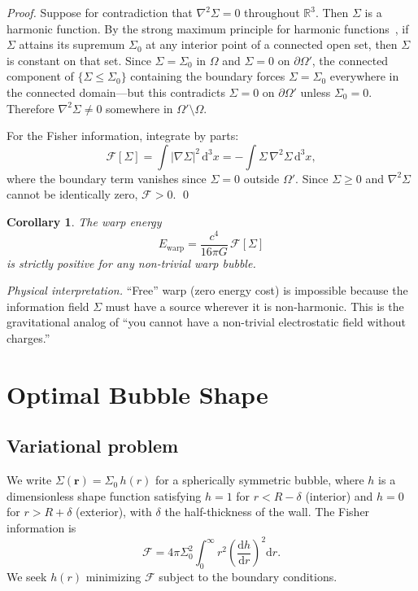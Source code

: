 \documentclass[prd,twocolumn,superscriptaddress,longbibliography]{revtex4-2}
\newcommand{\Ewarp}{E_{\mathrm{warp}}}
\newcommand{\Fisher}{\mathcal{F}}
\newcommand{\dd}{\mathrm{d}}
\newtheorem{corollary}{Corollary}
\begin{document}
\noindent\emph{Proof.}\;
Suppose for contradiction that $\nabla^2\Sigma = 0$ throughout
$\mathbb{R}^3$.  Then $\Sigma$ is a harmonic function.  By the
strong maximum principle for harmonic functions~\cite{EvansBook},
if $\Sigma$ attains its supremum $\Sigma_0$ at any interior point
of a connected open set, then $\Sigma$ is constant on that set.
Since $\Sigma = \Sigma_0$ in $\Omega$ and $\Sigma = 0$ on
$\partial\Omega'$, the connected component of
$\{\Sigma \leq \Sigma_0\}$ containing the boundary forces
$\Sigma = \Sigma_0$ everywhere in the connected domain---but
this contradicts $\Sigma = 0$ on $\partial\Omega'$ unless
$\Sigma_0 = 0$.  Therefore $\nabla^2\Sigma \neq 0$ somewhere
in $\Omega' \setminus \Omega$.

For the Fisher information, integrate by parts:
\begin{equation}
\Fisher[\Sigma] = \int |\nabla\Sigma|^2\,\dd^3x
= -\int \Sigma\,\nabla^2\Sigma\,\dd^3x,
\end{equation}
where the boundary term vanishes since $\Sigma = 0$ outside
$\Omega'$.  Since $\Sigma \geq 0$ and $\nabla^2\Sigma$ cannot be
identically zero, $\Fisher > 0$.  \qed

\begin{corollary}
The warp energy
\begin{equation}
\Ewarp = \frac{c^4}{16\pi G}\,\Fisher[\Sigma]
\end{equation}
is strictly positive for any non-trivial warp bubble.
\end{corollary}

\noindent\emph{Physical interpretation.}  ``Free'' warp (zero
energy cost) is impossible because the information field $\Sigma$
must have a source wherever it is non-harmonic.  This is the
gravitational analog of ``you cannot have a non-trivial
electrostatic field without charges.''

\section{Optimal Bubble Shape}
\label{sec:optimal}

\subsection{Variational problem}

We write $\Sigma(\mathbf{r}) = \Sigma_0\,h(r)$ for a spherically
symmetric bubble, where $h$ is a dimensionless shape function
satisfying $h = 1$ for $r < R - \delta$ (interior) and
$h = 0$ for $r > R + \delta$ (exterior), with $\delta$ the
half-thickness of the wall.  The Fisher information is
\begin{equation}
\label{eq:Fisher_h}
\Fisher = 4\pi\Sigma_0^2
\int_0^\infty r^2\!\left(\frac{\dd h}{\dd r}\right)^{\!2}\dd r.
\end{equation}
We seek $h(r)$ minimizing $\Fisher$ subject to the boundary
conditions.
\end{document}
